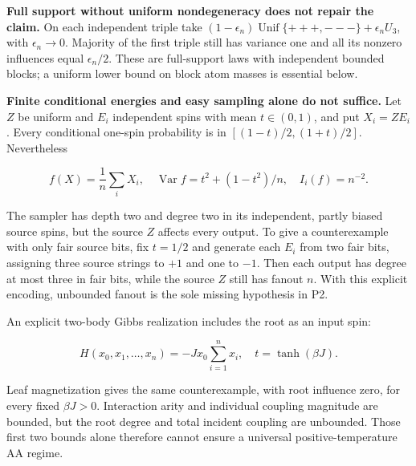 \textbf{Full support without uniform nondegeneracy does not repair the
claim.} On each independent triple take
\((1-\epsilon _n) \operatorname{Unif}\{+++ , ---\}+\epsilon _n U_3\), with
\(\epsilon _n \to  0\). Majority of the first triple still has variance
one and all its nonzero influences equal \(\epsilon _n/2\). These are
full-support laws with independent bounded blocks; a uniform lower bound
on block atom masses is essential below.

\textbf{Finite conditional energies and easy sampling alone do not
suffice.} Let \(Z\) be uniform and \(E_i\) independent spins
with mean \(t \in (0,1)\), and put \(X_i=ZE_i\). Every conditional
one-spin probability is in \([(1-t)/2,(1+t)/2]\). Nevertheless

\[
f(X)=\frac1n\sum_iX_i,\quad
\operatorname{Var}f=t^2+(1-t^2)/n,\quad I_i(f)=n^{-2}.
\]

The sampler has depth two and degree two in its independent, partly
biased source spins, but the source \(Z\) affects every output. To give
a counterexample with only fair source bits, fix \(t=1/2\) and generate
each \(E_i\) from two fair bits, assigning three source strings
to \(+1\) and one to \(-1\). Then each output has degree at most three
in fair bits, while the source \(Z\) still has fanout \(n\). With this
explicit encoding, unbounded fanout is the sole missing hypothesis in
P2.

An explicit two-body Gibbs realization includes the root as an input
spin:

\[
H(x_0,x_1,\ldots,x_n)=-Jx_0\sum_{i=1}^n x_i,
\quad t=\tanh(\beta J).
\]

Leaf magnetization gives the same counterexample, with root influence
zero, for every fixed \(\beta  J>0\). Interaction arity and individual
coupling magnitude are bounded, but the root degree and total incident
coupling are unbounded. Those first two bounds alone therefore cannot
ensure a universal positive-temperature AA regime.
